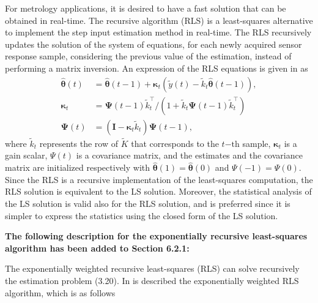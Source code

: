 \documentclass[11pt]{article}
\begin{document}
\begin{itemize}
    For metrology applications, it is desired to have a fast solution that can be obtained in real-time. 
    The recursive algorithm (RLS) is a least-squares alternative to implement the step input estimation method in real-time.
    The RLS recursively updates the solution of the system of equations, for each newly acquired sensor response sample, considering the previous value of the estimation, instead of performing a matrix inversion.
    An expression of the RLS equations is given in \cite{Kailath00book} as
    \begin{equation} \tag{3.21} \begin{aligned} \widehat{\bm{\theta}}(t) &= \widehat{\bm{\theta}}(t-1) + \bm{\kappa}_{t} \left( \widetilde{y}(t) - \widetilde{k}_{t} \widehat{\bm{\theta}}(t-1) \right) , \\  \bm{\kappa}_{t} &= \bm{\Psi}(t-1) \widetilde{k}_{t}^\top / \left( 1 + \widetilde{k}_{t} \bm{\Psi}(t-1) \widetilde{k}_{t}^\top  \right) \\ \bm{\Psi}(t) &= \left( \mathbf{I} - \bm{\kappa}_{t} \widetilde{k}_{t} \right) \bm{\Psi}(t-1), \label{eqn:RLS} \end{aligned} \end{equation}
    where $\widetilde{k}_{t}$ represents the row of $\widetilde{K}$ that corresponds to the $t\mathrm{-th}$ sample, $\bm{\kappa}_{t}$ is a gain scalar, $\Psi(t)$ is a covariance matrix, and the estimates and the covariance matrix are initialized respectively with $\widehat{\bm{\theta}}(1)= \widehat{\bm{\theta}}(0)$ and $\Psi(-1) = \Psi(0)$.
    Since the RLS is a recursive implementation of the least-squares computation, the RLS solution is equivalent to the LS solution.
    Moreover, the statistical analysis of the LS solution is valid also for the RLS solution, and is preferred since it is simpler to express the statistics using the closed form of the LS solution.    
    \color{black}	
    
    {\bfseries The following description for the exponentially recursive least-squares algorithm has been added to Section 6.2.1:}    

    
    \color{blue}
    The exponentially weighted recursive least-squares (RLS) can solve recursively the estimation problem (3.20).
    In \cite{Kailath00book} is described the exponentially weighted RLS algorithm, which is as follows


\end{itemize}
\end{document}
